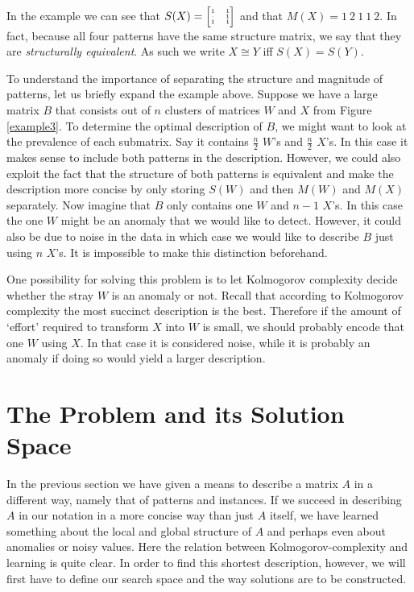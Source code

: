 \documentclass{llncs}
\begin{document}
In the example we can see that $S(X)= \tiny\begin{bmatrix}1 & 1 \\[-.2em]\cdot & 1 \\[-.2em]1 & 1\end{bmatrix}$ and that $M(X)=1\ 2\ 1\ 1\ 2$. In fact, because all four patterns have the same structure matrix, we say that they are \emph{structurally equivalent}. As such we write $X \cong Y$ iff $S(X) = S(Y)$. 

To understand the importance of separating the structure and magnitude of patterns, let us briefly expand the example above. Suppose we have a large matrix $B$ that consists out of $n$ clusters of matrices $W$ and $X$ from Figure \ref{example3}. To determine the optimal description of $B$, we might want to look at the prevalence of each submatrix. Say it contains $\frac{n}{2}$ $W$'s and $\frac{n}{2}$ $X$'s. In this case it makes sense to include both patterns in the description. However, we could also exploit the fact that the structure of both patterns is equivalent and make the description more concise by only storing $S(W)$ and then $M(W)$ and $M(X)$ separately. Now imagine that $B$ only contains one $W$ and $n-1$ $X$'s. In this case the one $W$ might be an anomaly that we would like to detect. However, it could also be due to noise in the data in which case we would like to describe $B$ just using $n$ $X$'s. It is impossible to make this distinction beforehand. 

One possibility for solving this problem is to let Kolmogorov complexity decide whether the stray $W$ is an anomaly or not. Recall that according to Kolmogorov complexity the most succinct description is the best. Therefore if the amount of `effort' required to transform $X$ into $W$ is small, we should probably encode that one $W$ using $X$. In that case it is considered noise, while it is probably an anomaly if doing so would yield a larger description.


\section{The Problem and its Solution Space}

In the previous section we have given a means to describe a matrix $A$ in a different way, namely that of patterns and instances. If we succeed in describing $A$ in our notation in a more concise way than just $A$ itself, we have learned something about the local and global structure of $A$ and perhaps even about anomalies or noisy values. Here the relation between Kolmogorov-complexity and learning is quite clear. In order to find this shortest description, however, we will first have to define our search space and the way solutions are to be constructed.
\end{document}
